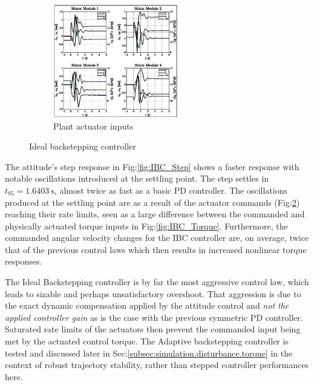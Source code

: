 \begin{figure}[htbp]
\begin{subfigure}{\textwidth}
\centering
\includegraphics[width=0.6\textwidth]{graphs/IBC_Input}
\vspace{-8pt}
\caption{Plant actuator inputs}
\label{fig:IBC_Input}
\end{subfigure}
\vspace{-8pt}
\caption{Ideal backstepping controller}
\vspace{-10pt}
\end{figure}
\par
The attitude's step response in Fig:\ref{fig:IBC_Step} shows a faster response with notable oscillations introduced at the settling point. The step settles in $t_{95}=1.6403~\text{s}$, almost twice as fast as a basic PD controller. The oscillations produced at the settling point are as a result of the actuator commands (Fig:\ref{fig:IBC_Input}) reaching their rate limits, seen as a large difference between the commanded and physically actuated torque inputs in Fig:\ref{fig:IBC_Torque}. Furthermore, the commanded angular velocity changes for the IBC controller are, on average, twice that of the previous control laws which then results in increased nonlinear torque responses.
\par
The Ideal Backstepping controller is by far the most aggressive control law, which leads to sizable and perhaps unsatisfactory overshoot. That aggression is due to the exact dynamic compensation applied by the attitude control and \emph{not the applied controller gain} as is the case with the previous symmetric PD controller. Saturated rate limits of the actuators then prevent the commanded input being met by the actuated control torque. The Adaptive backstepping controller is tested and discussed later in Sec:\ref{subsec:simulation.disturbance.torque} in the context of robust trajectory stability, rather than stepped controller performances here.
